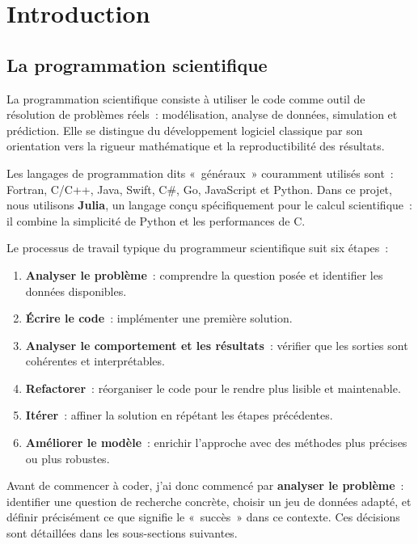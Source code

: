 \documentclass[a4paper,12pt,french]{article}
\begin{document}
\section{Introduction}

\subsection{La programmation scientifique}

La programmation scientifique consiste à utiliser le code comme outil de
résolution de problèmes réels~: modélisation, analyse de données, simulation
et prédiction. Elle se distingue du développement logiciel classique par son
orientation vers la rigueur mathématique et la reproductibilité des résultats.

Les langages de programmation dits «~généraux~» couramment utilisés sont~:
Fortran, C/C++, Java, Swift, C\#, Go, JavaScript et Python. Dans ce projet,
nous utilisons \textbf{Julia}, un langage conçu spécifiquement pour le calcul
scientifique~: il combine la simplicité de Python et les performances de C.

Le processus de travail typique du programmeur scientifique suit six étapes~:

\begin{enumerate}
  \item \textbf{Analyser le problème}~: comprendre la question posée et identifier
        les données disponibles.
  \item \textbf{Écrire le code}~: implémenter une première solution.
  \item \textbf{Analyser le comportement et les résultats}~: vérifier que les
        sorties sont cohérentes et interprétables.
  \item \textbf{Refactorer}~: réorganiser le code pour le rendre plus lisible
        et maintenable.
  \item \textbf{Itérer}~: affiner la solution en répétant les étapes précédentes.
  \item \textbf{Améliorer le modèle}~: enrichir l'approche avec des méthodes
        plus précises ou plus robustes.
\end{enumerate}

Avant de commencer à coder, j'ai donc commencé par \textbf{analyser le problème}~:
identifier une question de recherche concrète, choisir un jeu de données adapté,
et définir précisément ce que signifie le «~succès~» dans ce contexte. Ces décisions
sont détaillées dans les sous-sections suivantes.
\end{document}
